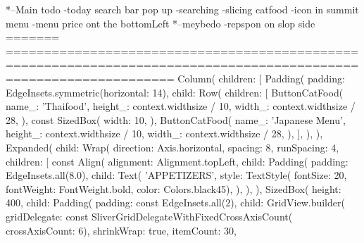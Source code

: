 *--Main todo 
-today  search bar pop up 
-searching
-slicing catfood 
-icon in summit menu
-menu price ont the bottomLeft
*--meybedo
-repspon on slop side
=======
==================================================================================================================
                Column(
                    children: [
                      Padding(
                        padding: EdgeInsets.symmetric(horizontal: 14),
                        child: Row(
                          children: [
                            ButtonCatFood(
                              name_: 'Thaifood',
                              height_: context.widthsize / 10,
                              width_: context.widthsize / 28,
                            ),
                            const SizedBox(
                              width: 10,
                            ),
                            ButtonCatFood(
                              name_: 'Japanese Menu',
                              height_: context.widthsize / 10,
                              width_: context.widthsize / 28,
                            ),
                          ],
                        ),
                      ),
                      Expanded(
                        child: Wrap(
                          direction: Axis.horizontal,
                          spacing: 8,
                          runSpacing: 4,
                          children: [
                            const Align(
                              alignment: Alignment.topLeft,
                              child: Padding(
                                padding: EdgeInsets.all(8.0),
                                child: Text(
                                  'APPETIZERS',
                                  style: TextStyle(
                                      fontSize: 20,
                                      fontWeight: FontWeight.bold,
                                      color: Colors.black45),
                                ),
                              ),
                            ),
                            SizedBox(
                              height: 400,
                              child: Padding(
                                padding: const EdgeInsets.all(2),
                                child: GridView.builder(
                                    gridDelegate:
                                        const SliverGridDelegateWithFixedCrossAxisCount(
                                            crossAxisCount: 6),
                                    shrinkWrap: true,
                                    itemCount: 30,
